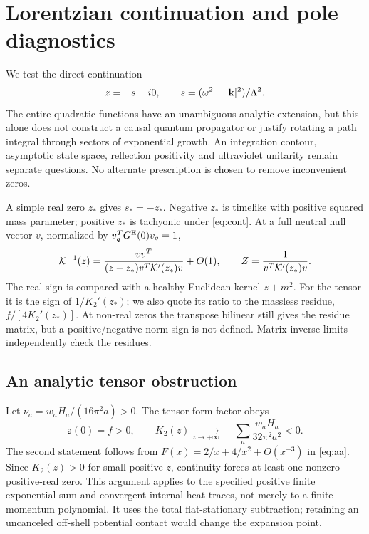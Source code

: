 \section{Lorentzian continuation and pole diagnostics}

We test the direct continuation
\begin{equation}
 z=-s-i0,\qquad s=(\omega^2-|\mathbf k|^2)/\Lambda^2.\label{eq:cont}
\end{equation}
The entire quadratic functions have an unambiguous analytic extension, but this alone does not construct a causal quantum propagator or justify rotating a path integral through sectors of exponential growth. An integration contour, asymptotic state space, reflection positivity and ultraviolet unitarity remain separate questions. No alternate prescription is chosen to remove inconvenient zeros.

A simple real zero $z_*$ gives $s_*=-z_*$. Negative $z_*$ is timelike with positive squared mass parameter; positive $z_*$ is tachyonic under \eqref{eq:cont}. At a full neutral null vector $v$, normalized by $v_q^TG^{\mathrm E}(0)v_q=1$,
\begin{equation}
 \mathcal K^{-1}(z)=\frac{v v^T}{(z-z_*)v^T\mathcal K'(z_*)v}+O(1),\qquad
 Z=\frac1{v^T\mathcal K'(z_*)v}.\label{eq:residue}
\end{equation}
The real sign is compared with a healthy Euclidean kernel $z+m^2$. For the tensor it is the sign of $1/K_2'(z_*)$; we also quote its ratio to the massless residue, $f/[4K_2'(z_*)]$. At non-real zeros the transpose bilinear still gives the residue matrix, but a positive/negative norm sign is not defined. Matrix-inverse limits independently check the residues.

\subsection{An analytic tensor obstruction}

Let $\nu_a=w_aH_a/(16\pi^2a)>0$. The tensor form factor obeys
\begin{equation}
 \mathsf a(0)=f>0,\qquad
 K_2(z)\underset{z\to+\infty}{\longrightarrow}
 -\sum_a\frac{w_aH_a}{32\pi^2a^2}<0.\label{eq:tensorobstruction}
\end{equation}
The second statement follows from $F(x)=2/x+4/x^2+O(x^{-3})$ in \eqref{eq:aa}. Since $K_2(z)>0$ for small positive $z$, continuity forces at least one nonzero positive-real zero. This argument applies to the specified positive finite exponential sum and convergent internal heat traces, not merely to a finite momentum polynomial. It uses the total flat-stationary subtraction; retaining an uncanceled off-shell potential contact would change the expansion point.

